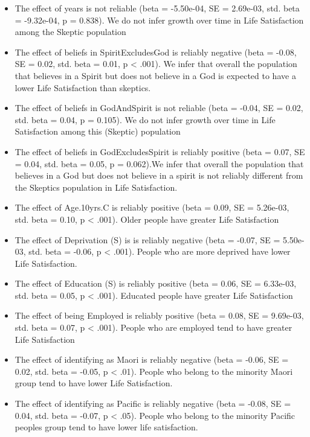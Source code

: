 \documentclass[
  english,
  man]{apa6}
\providecommand{\tightlist}{%
  \setlength{\itemsep}{0pt}\setlength{\parskip}{0pt}}
\begin{document}
\begin{itemize}
\tightlist
\item
  The effect of years is not reliable (beta = -5.50e-04, SE = 2.69e-03, std. beta = -9.32e-04, p = 0.838). We do not infer growth over time in Life Satisfaction among the Skeptic population
\item
  The effect of beliefs in SpiritExcludesGod is reliably negative (beta = -0.08, SE = 0.02, std. beta = 0.01, p \textless{} .001). We infer that overall the population that believes in a Spirit but does not believe in a God is expected to have a lower Life Satisfaction than skeptics.
\item
  The effect of beliefs in GodAndSpirit is not reliable (beta = -0.04, SE = 0.02, std. beta = 0.04, p = 0.105). We do not infer growth over time in Life Satisfaction among this (Skeptic) population
\item
  The effect of beliefs in GodExcludesSpirit is reliably positive (beta = 0.07, SE = 0.04, std. beta = 0.05, p = 0.062).We infer that overall the population that believes in a God but does not believe in a spirit is not reliably different from the Skeptics population in Life Satisfaction.
\item
  The effect of Age.10yrs.C is reliably positive (beta = 0.09, SE = 5.26e-03, std. beta = 0.10, p \textless{} .001). Older people have greater Life Satisfaction
\item
  The effect of Deprivation (S) is is reliably negative (beta = -0.07, SE = 5.50e-03, std. beta = -0.06, p \textless{} .001). People who are more deprived have lower Life Satisfaction.
\item
  The effect of Education (S) is reliably positive (beta = 0.06, SE = 6.33e-03, std. beta = 0.05, p \textless{} .001). Educated people have greater Life Satisfaction
\item
  The effect of being Employed is reliably positive (beta = 0.08, SE = 9.69e-03, std. beta = 0.07, p \textless{} .001). People who are employed tend to have greater Life Satisfaction
\item
  The effect of identifying as Maori is reliably negative (beta = -0.06, SE = 0.02, std. beta = -0.05, p \textless{} .01). People who belong to the minority Maori group tend to have lower Life Satisfaction.
\item
  The effect of identifying as Pacific is reliably negative (beta = -0.08, SE = 0.04, std. beta = -0.07, p \textless{} .05). People who belong to the minority Pacific peoples group tend to have lower life satisfaction.

\end{itemize}
\end{document}
